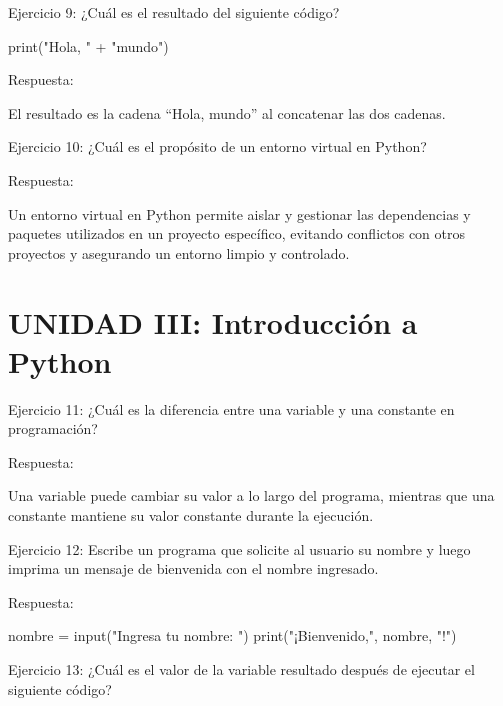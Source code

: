 \documentclass[
  a4paper,
  onepage,
  openany]{scrreprt}
\newenvironment{Shaded}{\begin{snugshade}}{\end{snugshade}}
\newcommand{\BuiltInTok}[1]{\textcolor[rgb]{0.00,0.23,0.31}{#1}}
\newcommand{\NormalTok}[1]{\textcolor[rgb]{0.00,0.23,0.31}{#1}}
\newcommand{\OperatorTok}[1]{\textcolor[rgb]{0.37,0.37,0.37}{#1}}
\newcommand{\StringTok}[1]{\textcolor[rgb]{0.13,0.47,0.30}{#1}}
\begin{document}
Ejercicio 9: ¿Cuál es el resultado del siguiente código?

\begin{Shaded}
\begin{Highlighting}[]
\BuiltInTok{print}\NormalTok{(}\StringTok{"Hola, "} \OperatorTok{+} \StringTok{"mundo"}\NormalTok{)}
\end{Highlighting}
\end{Shaded}

Respuesta:

El resultado es la cadena ``Hola, mundo'' al concatenar las dos cadenas.

Ejercicio 10: ¿Cuál es el propósito de un entorno virtual en Python?

Respuesta:

Un entorno virtual en Python permite aislar y gestionar las dependencias
y paquetes utilizados en un proyecto específico, evitando conflictos con
otros proyectos y asegurando un entorno limpio y controlado.

\hypertarget{unidad-iii-introducciuxf3n-a-python}{%
\section{UNIDAD III: Introducción a
Python}\label{unidad-iii-introducciuxf3n-a-python}}

Ejercicio 11: ¿Cuál es la diferencia entre una variable y una constante
en programación?

Respuesta:

Una variable puede cambiar su valor a lo largo del programa, mientras
que una constante mantiene su valor constante durante la ejecución.

Ejercicio 12: Escribe un programa que solicite al usuario su nombre y
luego imprima un mensaje de bienvenida con el nombre ingresado.

Respuesta:

\begin{Shaded}
\begin{Highlighting}[]
\NormalTok{nombre }\OperatorTok{=} \BuiltInTok{input}\NormalTok{(}\StringTok{"Ingresa tu nombre: "}\NormalTok{)}
\BuiltInTok{print}\NormalTok{(}\StringTok{"¡Bienvenido,"}\NormalTok{, nombre, }\StringTok{"!"}\NormalTok{)}
\end{Highlighting}
\end{Shaded}

Ejercicio 13: ¿Cuál es el valor de la variable resultado después de
ejecutar el siguiente código?
\end{document}
